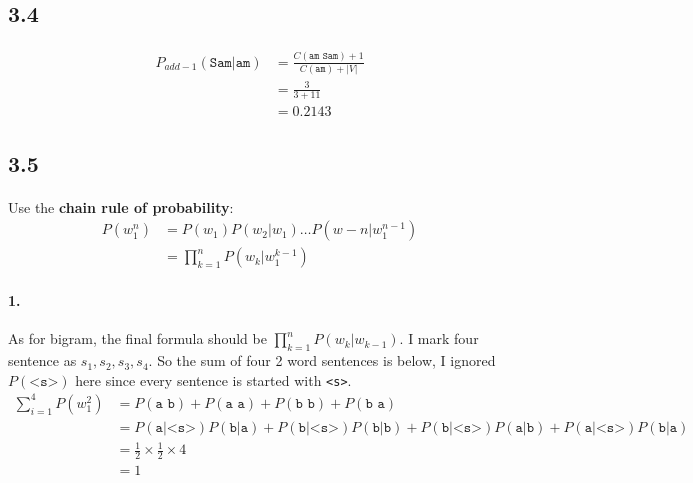 \documentclass{article}
\begin{document}
\subsection*{3.4}
\paragraph{}
\begin{align*}
    P_{add-1}(\texttt{Sam|am}) & = \frac{C(\texttt{am Sam}) + 1}{C(\texttt{am}) + |V|} \\
                               & = \frac{3}{3 + 11}                                    \\
                               & = 0.2143
\end{align*}

\subsection*{3.5}
\paragraph{}
Use the \textbf{chain rule of probability}:
\begin{align*}
    P(w_1^n) & = P(w_1)P(w_2|w_1) \dots P(w-n|w_1^{n-1}) \\
             & = \prod_{k=1}^{n} P(w_k|w_1^{k-1})
\end{align*}

\paragraph{1.}
As for bigram, the final formula should be $\prod_{k=1}^{n} P(w_k|w_{k-1})$.
I mark four sentence as $s_1, s_2, s_3, s_4$.
So the sum of four 2 word sentences is below, I ignored $P(\texttt{<s>})$
here since every sentence is started with \texttt{<s>}.
\begin{align*}
    \sum_{i=1}^{4}P(w_1^2) & = P(\texttt{a b}) + P(\texttt{a a}) + P(\texttt{b b}) + P(\texttt{b a}) \\
                           & = P(\texttt{a|<s>})P(\texttt{b|a}) + P(\texttt{b|<s>})P(\texttt{b|b})
    + P(\texttt{b|<s>})P(\texttt{a|b}) + P(\texttt{a|<s>})P(\texttt{b|a})                            \\
                           & = \frac{1}{2} \times \frac{1}{2} \times 4                               \\
                           & = 1
\end{align*}
\end{document}
